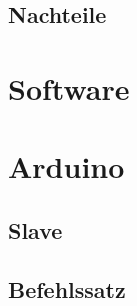 \documentclass[a4paper,10pt]{article}
\begin{document}
\subsection{Nachteile}

\section {Software}

\section {Arduino}
\subsection{Slave}
\subsection{Befehlssatz}
\end{document}
